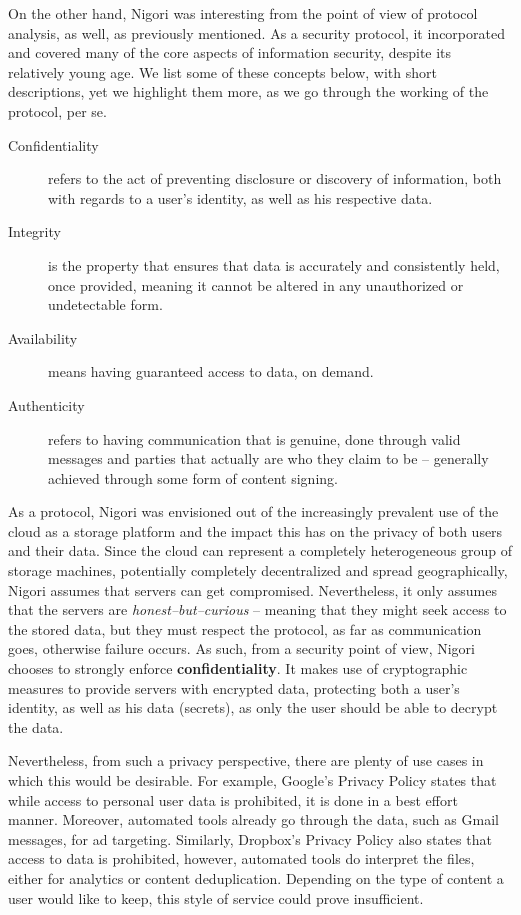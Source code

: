 
On the other hand, Nigori was interesting from the point of view of protocol analysis, as well, as previously mentioned.
As a security protocol, it incorporated and covered many of the core aspects of information security, despite its relatively young age.
We list some of these concepts below, with short descriptions, yet we highlight them more, as we go through the working of the protocol, per se.
\begin{description}
\item[Confidentiality] refers to the act of preventing disclosure or discovery of information, both with regards to a user's identity, as well as his respective data.

\item[Integrity] is the property that ensures that data is accurately and consistently held, once provided, meaning it cannot be altered in any unauthorized or undetectable form.

\item[Availability] means having guaranteed access to data, on demand.

\item[Authenticity] refers to having communication that is genuine, done through valid messages and parties that actually are who they claim to be -- generally achieved through some form of content signing.
\end{description}

As a protocol, Nigori was envisioned out of the increasingly prevalent use of the cloud as a storage platform and the impact this has on the privacy of both users and their data.
Since the cloud can represent a completely heterogeneous group of storage machines, potentially completely decentralized and spread geographically, Nigori assumes that servers can get compromised.
Nevertheless, it only assumes that the servers are \textit{honest--but--curious} -- meaning that they might seek access to the stored data, but they must respect the protocol, as far as communication goes, otherwise failure occurs.
As such, from a security point of view, Nigori chooses to strongly enforce \textbf{confidentiality}.
It makes use of cryptographic measures to provide servers with encrypted data, protecting both a user's identity, as well as his data (secrets), as only the user should be able to decrypt the data.

Nevertheless, from such a privacy perspective, there are plenty of use cases in which this would be desirable.
For example, Google's Privacy Policy \cite{GooglePrivacy} states that while access to personal user data is prohibited, it is done in a best effort manner.
Moreover, automated tools already go through the data, such as Gmail messages, for ad targeting.
Similarly, Dropbox's Privacy Policy \cite{DropboxPolicy} also states that access to data is prohibited, however, automated tools do interpret the files, either for analytics or content deduplication.
Depending on the type of content a user would like to keep, this style of service could prove insufficient.

